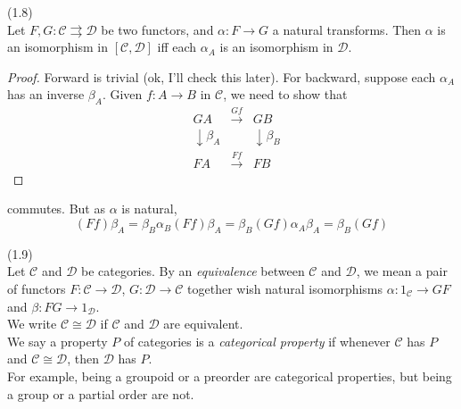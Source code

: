 \documentclass[a4paper]{article}
\begin{document}
\begin{lemma} (1.8)\\
    Let $F,G: \mathcal{C} \rightrightarrows \mathcal{D}$ be two functors, and $\alpha: F \to G$ a natural transforms. Then $\alpha$ is an isomorphism in $[\mathcal{C},\mathcal{D}]$ iff each $\alpha_A$ is an isomorphism in $\mathcal{D}$.
    \begin{proof}
        Forward is trivial (ok, I'll check this later). For backward, suppose each $\alpha_A$ has an inverse $\beta_A$. Given $f:A \to B$ in $\mathcal{C}$, we need to show that 
        \begin{equation*}
            \begin{aligned}
                &GA &\xrightarrow{Gf} &GB\\
                &\downarrow \beta_A & &\downarrow \beta_B\\
                &FA &\xrightarrow{Ff} & FB
            \end{aligned}
        \end{equation*}
    \end{proof}
    commutes. But as $\alpha$ is natural, 
    $$(Ff)\beta_A = \beta_B \alpha_B (Ff)\beta_A = \beta_B (Gf) \alpha_A \beta_A = \beta_B (Gf)$$
\end{lemma}

\begin{defi} (1.9)\\
    Let $\mathcal{C}$ and $\mathcal{D}$ be categories. By an \emph{equivalence} between $\mathcal{C}$ and $\mathcal{D}$, we mean a pair of functors $F:\mathcal{C} \to \mathcal{D}$, $G:\mathcal{D} \to \mathcal{C}$ together wish natural isomorphisms $\alpha: 1_\mathcal{C} \to GF$ and $\beta: FG \to 1_\mathcal{D}$.\\
    We write $\mathcal{C} \cong \mathcal{D}$ if $\mathcal{C}$ and $\mathcal{D}$ are equivalent.\\
    We say a property $P$ of categories is a \emph{categorical property} if whenever $\mathcal{C}$ has $P$ and $\mathcal{C} \cong \mathcal{D}$, then $\mathcal{D}$ has $P$.\\
    For example, being a groupoid or a preorder are categorical properties, but being a group or a partial order are not.
\end{defi}
\end{document}
